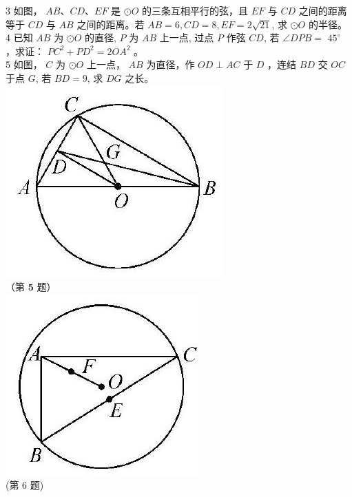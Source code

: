 \documentclass[10pt]{article}
\begin{document}
3 如图， $A B 、 C D 、 E F$ 是 $\odot O$ 的三条互相平行的弦，且 $E F$ 与 $C D$ 之间的距离等于 $C D$ 与 $A B$ 之间的距离。若 $A B=6, C D=8, E F=2 \sqrt{21}$, 求 $\odot O$ 的半径。\\
4 已知 $A B$ 为 $\odot O$ 的直径, $P$ 为 $A B$ 上一点, 过点 $P$ 作弦 $C D$, 若 $\angle D P B=$ $45^{\circ}$ ，求证： $P C^{2}+P D^{2}=2 O A^{2}$ 。\\
5 如图， $C$ 为 $\odot O$ 上一点， $A B$ 为直径，作 $O D \perp A C$ 于 $D$ ，连结 $B D$ 交 $O C$ 于点 $G$, 若 $B D=9$, 求 $D G$ 之长。\\
\includegraphics[max width=\textwidth, center]{2024_10_30_66b8e5e701da2093c133g-021(2)}\\
（第 $\mathbf{5}$ 题）\\
\includegraphics[max width=\textwidth, center]{2024_10_30_66b8e5e701da2093c133g-021}\\
(第 6 题)
\end{document}
